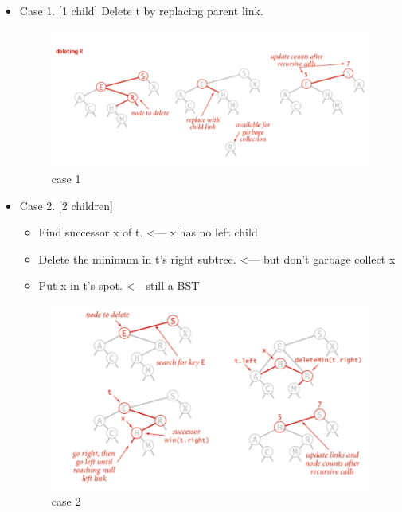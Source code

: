 \documentclass[12pt ,a4paper]{exam}
\begin{document}
\begin{enumerate}[start=1,label={\bfseries Q\arabic*)}]
\begin{itemize}
		 	\item Case 1. [1 child] Delete t by replacing parent link.
		 	\begin{figure}[h]
		 		\centering
		 		\includegraphics[width=0.7\linewidth]{"Screenshot 2020-12-26 at 8.39.09 AM"}
		 		\caption{case 1}
		 		\label{fig:screenshot-2020-12-26-at-8}
		 	\end{figure}
		 	
		 	\item Case 2. [2 children]
		 		\begin{itemize}
		 			\item Find successor x of t. <— x has no left child
		 			\item Delete the minimum in t’s right subtree. <— but don’t
		 			garbage collect x
		 			\item Put x in t’s spot. <—still a BST
		 		\end{itemize}
	 		\begin{figure}[h]
	 			\centering
	 			\includegraphics[width=0.7\linewidth]{"Screenshot 2020-12-26 at 8.39.22 AM"}
	 			\caption{case 2}
	 			\label{fig:screenshot-2020-12-26-at-8}
	 		\end{figure}
	 		

\end{itemize}
\end{enumerate}
\end{document}
